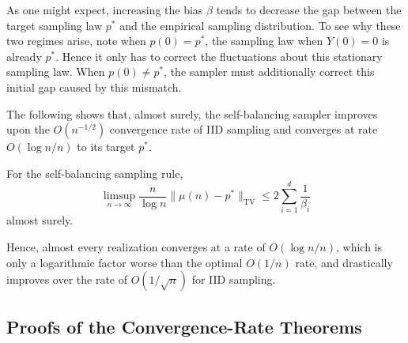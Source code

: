 As one might expect, increasing the bias $\beta$ tends to decrease the
 gap between the target sampling law $p^*$ and the empirical sampling 
 distribution. To see why these two regimes arise, note when $p(0) = p^*$, the sampling 
 law when $Y(0) = 0$ is already $p^*$. Hence it only has to correct the 
 fluctuations about this stationary sampling law. When $p(0) \neq p^*$, the sampler must 
 additionally correct this initial gap caused by this mismatch.

The following shows that, almost surely, the self-balancing sampler improves upon the 
$O(n^{-1/2})$ convergence rate of IID sampling and converges at rate 
$O(\log n/n)$ to its target $p^*$.

\begin{theorem} \label{thm:limit_probabilities}
    For the self-balancing sampling rule, 
    $$\limsup_{n\to\infty}\frac{n}{\log n}\| \mu(n) - p^*\|_{\operatorname{TV}} \leq 2\sum_{i=1}^d \frac{1}{\beta_i}$$
    almost surely.
\end{theorem}

Hence, almost every realization converges at a rate of $O(\log n/n)$, which is only a logarithmic factor worse than the optimal $O(1/n)$ rate,
and drastically improves over the rate of $O(1/\sqrt n)$ for IID sampling.


\subsection{Proofs of the Convergence-Rate Theorems}

